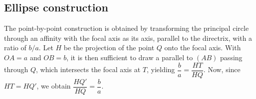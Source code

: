 
\subsection{Ellipse construction} %
\label{sub:ellipse_construction}

The point-by-point construction is obtained by transforming the principal circle through an affinity with the focal axis as its axis, parallel to the directrix, with a ratio of $b/a$. Let $H$ be the projection of the point $Q$ onto the focal axis. With $OA = a$ and $OB = b$, it is then sufficient to draw a parallel to $(AB)$ passing through $Q$, which intersects the focal axis at $T$, yielding $\dfrac{b}{a} = \dfrac{HT}{HQ}$. Now, since $HT = HQ'$, we obtain $ \dfrac{HQ'}{HQ} = \dfrac{b}{a} $.

